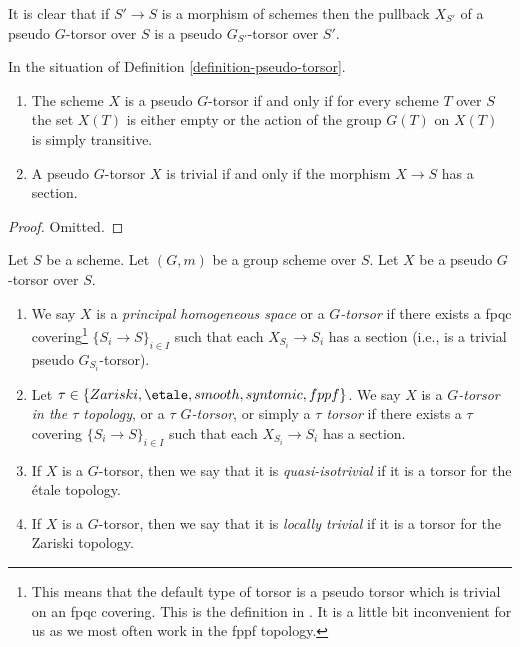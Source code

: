 \noindent
It is clear that if $S' \to S$ is a morphism of schemes then
the pullback $X_{S'}$ of a pseudo $G$-torsor over $S$ is a
pseudo $G_{S'}$-torsor over $S'$.

\begin{lemma}
\label{lemma-characterize-trivial-pseudo-torsors}
In the situation of
Definition \ref{definition-pseudo-torsor}.
\begin{enumerate}
\item The scheme $X$ is a pseudo $G$-torsor if and only if for every scheme
$T$ over $S$ the set $X(T)$ is either empty or the action of the group $G(T)$
on $X(T)$ is simply transitive.
\item A pseudo $G$-torsor $X$ is trivial if and only if the morphism
$X \to S$ has a section.
\end{enumerate}
\end{lemma}

\begin{proof}
Omitted.
\end{proof}

\begin{definition}
\label{definition-principal-homogeneous-space}
Let $S$ be a scheme.
Let $(G, m)$ be a group scheme over $S$.
Let $X$ be a pseudo $G$-torsor over $S$.
\begin{enumerate}
\item We say $X$ is a {\it principal homogeneous space}
or a {\it $G$-torsor} if there exists a fpqc covering\footnote{This means
that the default type of torsor is a pseudo torsor which is trivial on an
fpqc covering. This is the definition in \cite[Expos\'e IV, 6.5]{SGA3}.
It is a little bit inconvenient for us as we most often work in the fppf
topology.}
$\{S_i \to S\}_{i \in I}$ such that each
$X_{S_i} \to S_i$ has a section (i.e., is a trivial pseudo $G_{S_i}$-torsor).
\item Let $\tau \in \{Zariski, \etale, smooth, syntomic, fppf\}$.
We say $X$ is a {\it $G$-torsor in the $\tau$ topology}, or a
{\it $\tau$ $G$-torsor}, or simply a {\it $\tau$ torsor}
if there exists a $\tau$ covering $\{S_i \to S\}_{i \in I}$
such that each $X_{S_i} \to S_i$ has a section.
\item If $X$ is a $G$-torsor, then we say that it is
{\it quasi-isotrivial} if it is a torsor for the \'etale topology.
\item If $X$ is a $G$-torsor, then we say that it is
{\it locally trivial} if it is a torsor for the Zariski topology.
\end{enumerate}
\end{definition}

